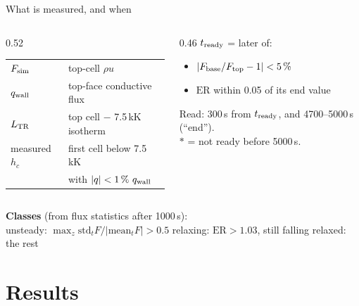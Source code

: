 \documentclass[aspectratio=169,10pt]{beamer}
\newcommand{\qwall}{q_{\rm wall}}
\newcommand{\LTR}{L_{\rm TR}}
\newcommand{\Fsim}{F_{\rm sim}}
\newcommand{\ER}{\mathrm{ER}}
\begin{document}
\begin{frame}{What is measured, and when}
  \begin{columns}[T]
    \begin{column}{0.52\textwidth}
      \small
      \begin{tabular}{@{}ll@{}}
        \toprule
        $\Fsim$ & top-cell $\rho u$ \\
        $\qwall$ & top-face conductive flux \\
        $\LTR$ & top cell $-$ 7.5\,kK isotherm \\
        measured $h_c$ & first cell below 7.5\,kK \\
         & with $|q| < 1\,\%\ \qwall$ \\
        \bottomrule
      \end{tabular}
    \end{column}
    \begin{column}{0.46\textwidth}
      \small
      $t_{\rm ready}$ = later of:
      \begin{itemize}
        \item $|F_{\rm base}/F_{\rm top}-1| < 5\,\%$
        \item $\ER$ within 0.05 of its end value
      \end{itemize}
      \vspace{4pt}
      Read: 300\,s from $t_{\rm ready}$, and 4700--5000\,s (``end'').\\
      $\ast$ = not ready before 5000\,s.
    \end{column}
  \end{columns}
  \vspace{10pt}
  \small\textbf{Classes} (from flux statistics after 1000\,s):\\[3pt]
  \colorbox{unsteady}{unsteady}: $\max_z \mathrm{std}_t F/|\mathrm{mean}_t F| > 0.5$
  \quad
  \colorbox{relaxing}{relaxing}: $\ER > 1.03$, still falling
  \quad
  \colorbox{relaxed}{relaxed}: the rest
\end{frame}

\section{Results}
\end{document}
